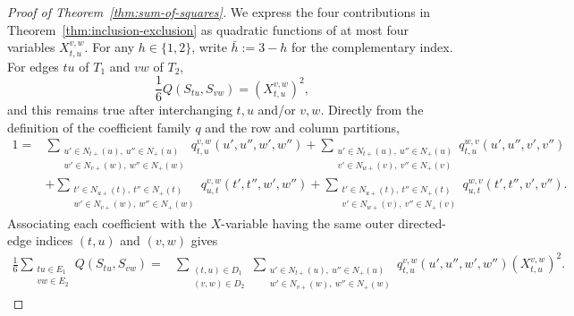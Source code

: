 \documentclass[12pt]{article}
\begin{document}
\begin{proof}[Proof of Theorem~\ref{thm:sum-of-squares}]
We express the four contributions in Theorem~\ref{thm:inclusion-exclusion}
as quadratic functions of at most four variables $X_{t,u}^{v,w}$.
For any $h\in\{1,2\}$, write $\bar h:=3-h$ for the complementary index.
For edges $tu$ of $T_1$ and $vw$ of $T_2$,
\begin{equation}\label{eq:display-027}
\frac16Q(S_{tu},S_{vw})=(X_{t,u}^{v,w})^2,
\end{equation}
and this remains true after interchanging $t,u$ and/or $v,w$.  Directly
from the definition of the coefficient family $q$ and the row and column
partitions,
\begin{equation}\label{eq:display-028}
\begin{aligned}
1={}&
\sum_{\substack{u'\in N_{t+}(u),\ u''\in N_+(u)\\
w'\in N_{v+}(w),\ w''\in N_+(w)}}
q_{t,u}^{v,w}(u',u'',w',w'')
+\sum_{\substack{u'\in N_{t+}(u),\ u''\in N_+(u)\\
v'\in N_{w+}(v),\ v''\in N_+(v)}}
q_{t,u}^{w,v}(u',u'',v',v'')\\
&+\sum_{\substack{t'\in N_{u+}(t),\ t''\in N_+(t)\\
w'\in N_{v+}(w),\ w''\in N_+(w)}}
q_{u,t}^{v,w}(t',t'',w',w'')
+\sum_{\substack{t'\in N_{u+}(t),\ t''\in N_+(t)\\
v'\in N_{w+}(v),\ v''\in N_+(v)}}
q_{u,t}^{w,v}(t',t'',v',v'').
\end{aligned}
\end{equation}
Associating each coefficient with the $X$-variable having the same outer
directed-edge indices $(t,u)$ and $(v,w)$ gives
\begin{align}
\frac16\sum_{\substack{tu\in E_1\\vw\in E_2}}Q(S_{tu},S_{vw})
={}&\sum_{\substack{(t,u)\in D_1\\(v,w)\in D_2}}
\sum_{\substack{u'\in N_{t+}(u),\ u''\in N_+(u)\\
w'\in N_{v+}(w),\ w''\in N_+(w)}}
q_{t,u}^{v,w}(u',u'',w',w'')
(X_{t,u}^{v,w})^2.                                      \label{eq:edge-edge}
\end{align}


\end{proof}
\end{document}
